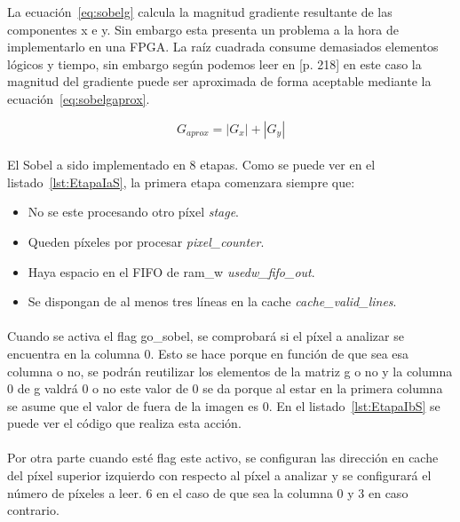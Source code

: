 \documentclass[a4paper,12pt,titlepage,final]{book}
\begin{document}
La ecuación~\ref{eq:sobelg} calcula la magnitud gradiente resultante de las componentes x e y. Sin embargo esta presenta un problema a la hora de implementarlo en una FPGA. La raíz cuadrada consume demasiados elementos lógicos y tiempo, sin embargo según podemos leer en [p. 218] \citet{Myler} en este caso la magnitud del gradiente puede ser aproximada de forma aceptable mediante la ecuación~\ref{eq:sobelgaprox}.

\begin{equation}\label{eq:sobelgaprox}
G_{aprox}=|G_x| + |G_y|
\end{equation}

\paragraph{}
El Sobel a sido implementado en 8 etapas. Como se puede ver en el listado~\ref{lst:EtapaIaS}, la primera etapa comenzara siempre que:

\begin{itemize}
 \item No se este procesando otro píxel \textit{stage}.
 \item Queden píxeles por procesar \textit{pixel\_counter}.
 \item Haya espacio en el FIFO de ram\_w \textit{usedw\_fifo\_out}.
 \item Se dispongan de al menos tres líneas en la cache \textit{cache\_valid\_lines}.
\end{itemize}



\paragraph{}
Cuando se activa el flag go\_sobel, se comprobará si el píxel a analizar se encuentra en la columna 0. Esto se hace porque en función de que sea esa columna o no, se podrán reutilizar los elementos de la matriz g o no y la columna 0 de g valdrá 0 o no este valor de 0 se da porque al estar en la primera columna se asume que el valor de fuera de la imagen es 0. En el listado~\ref{lst:EtapaIbS} se puede ver el código que realiza esta acción.



\paragraph{}
Por otra parte cuando esté flag este activo, se configuran las dirección en cache del píxel superior izquierdo con respecto al píxel a analizar y se configurará el número de píxeles a leer. 6 en el caso de que sea la columna 0 y 3 en caso contrario.
\end{document}
